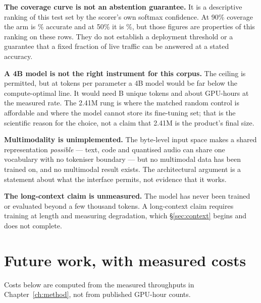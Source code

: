 \textbf{The coverage curve is not an abstention guarantee.} It is a descriptive
ranking of this test set by the scorer's own softmax confidence. At 90\% coverage
the arm is \ShipAtNinety\% accurate and at 50\% it is \ShipAtFifty\%, but those
figures are properties of this ranking on these rows. They do not establish a
deployment threshold or a guarantee that a fixed fraction of live traffic can be
answered at a stated accuracy.

\textbf{A 4B model is not the right instrument for this corpus.} The ceiling is
permitted, but at \FourBDN{} tokens per parameter a 4B model would be far below
the compute-optimal line. It would need \FourBTokensB{}B unique tokens and about
\FourBGPUHours{} GPU-hours at the measured rate. The 2.41M rung is where the
matched random control is affordable and where the model cannot store its
fine-tuning set; that is the scientific reason for the choice, not a claim that
2.41M is the product's final size.

\textbf{Multimodality is unimplemented.} The byte-level input space makes a shared
representation \emph{possible} --- text, code and quantised audio can share one
vocabulary with no tokeniser boundary --- but no multimodal data has been trained
on, and no multimodal result exists. The architectural argument is a statement
about what the interface permits, not evidence that it works.

\textbf{The long-context claim is unmeasured.} The model has never been trained or
evaluated beyond a few thousand tokens. A long-context claim requires training at
length and measuring degradation, which \S\ref{sec:context} begins and does not
complete.

\section{Future work, with measured costs}
\label{sec:future-work}
\label{sec:future}

Costs below are computed from the measured throughputs in Chapter~\ref{ch:method},
not from published GPU-hour counts.

